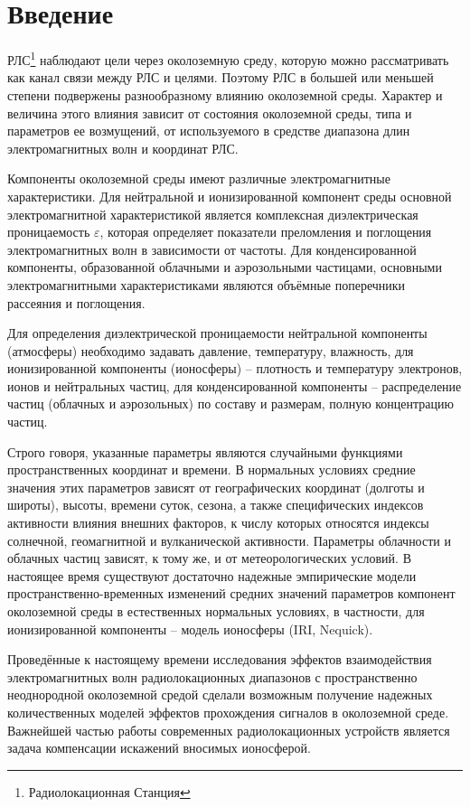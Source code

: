 \chapter*{Введение}							%

{
РЛС\footnote{Радиолокационная Станция} наблюдают цели через околоземную среду, которую можно рассматривать как канал связи между РЛС и целями. 
Поэтому РЛС в большей или меньшей степени подвержены разнообразному влиянию околоземной среды. Характер и
величина этого влияния зависит от состояния околоземной среды, типа и параметров ее возмущений, от используемого
в средстве диапазона длин электромагнитных волн и координат РЛС.

Компоненты околоземной среды имеют различные электромагнитные характеристики. Для нейтральной и ионизированной
компонент среды основной электромагнитной характеристикой является комплексная диэлектрическая проницаемость
$\varepsilon$, которая определяет показатели преломления и поглощения
электромагнитных волн в зависимости от частоты. Для конденсированной компоненты, образованной облачными и
аэрозольными частицами, основными электромагнитными характеристиками являются объёмные поперечники рассеяния и
поглощения.

Для определения диэлектрической проницаемости нейтральной компоненты (атмосферы) необходимо задавать давление,
температуру, влажность, для ионизированной компоненты (ионосферы) -- плотность и температуру электронов, ионов и
нейтральных частиц, для конденсированной компоненты -- распределение частиц (облачных и аэрозольных) по составу
и размерам, полную концентрацию частиц.

Строго говоря, указанные параметры являются случайными функциями пространственных координат и времени. 
В нормальных условиях средние значения этих параметров зависят от географических координат (долготы и широты),
высоты, времени суток, сезона, а также специфических индексов активности влияния внешних факторов, к числу
которых относятся индексы солнечной, геомагнитной и вулканической активности. Параметры облачности и облачных
частиц зависят, к тому же, и от метеорологических условий. В настоящее время существуют достаточно надежные 
эмпирические модели пространственно-временных изменений средних значений параметров компонент околоземной среды
в естественных нормальных условиях, в частности, для ионизированной компоненты -- модель ионосферы
(IRI, Nequick).

Проведённые к настоящему времени исследования эффектов взаимодействия электромагнитных волн радиолокационных
диапазонов с пространственно неоднородной околоземной средой сделали возможным получение надежных
количественных моделей эффектов прохождения сигналов в околоземной среде. Важнейшей частью работы современных 
радиолокационных устройств является задача компенсации искажений вносимых ионосферой.

}
